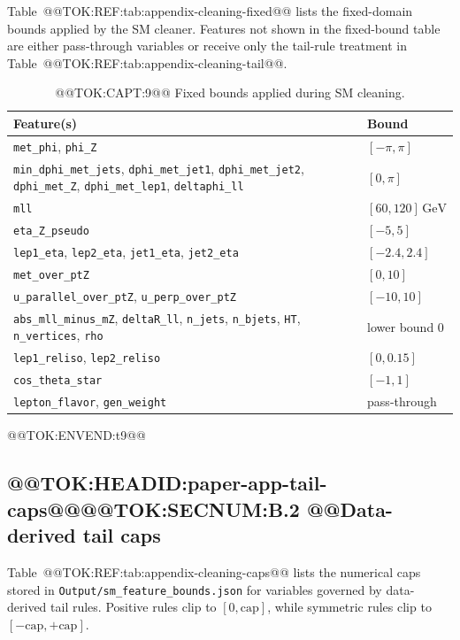\documentclass[11pt]{article}
\newcommand{\GeV}{\text{GeV}}
\begin{document}
Table~@@TOK:REF:tab:appendix-cleaning-fixed@@ lists the fixed-domain bounds applied by the SM
cleaner. Features not shown in the fixed-bound table are either pass-through variables or
receive only the tail-rule treatment in Table~@@TOK:REF:tab:appendix-cleaning-tail@@.

\begin{table}[h]
\centering
\caption{@@TOK:CAPT:9@@ Fixed bounds applied during SM cleaning.}
\label{tab:appendix-cleaning-fixed}
%
\begin{tabular}{ll}
\toprule
Feature(s) & Bound \\
\midrule
\texttt{met\_phi}, \texttt{phi\_Z} & \([-\pi,\pi]\) \\
\texttt{min\_dphi\_met\_jets}, \texttt{dphi\_met\_jet1}, \texttt{dphi\_met\_jet2}, \texttt{dphi\_met\_Z}, \texttt{dphi\_met\_lep1}, \texttt{deltaphi\_ll} & \([0,\pi]\) \\
\texttt{mll} & \([60,120]\,\GeV\) \\
\texttt{eta\_Z\_pseudo} & \([-5,5]\) \\
\texttt{lep1\_eta}, \texttt{lep2\_eta}, \texttt{jet1\_eta}, \texttt{jet2\_eta} & \([-2.4,2.4]\) \\
\texttt{met\_over\_ptZ} & \([0,10]\) \\
\texttt{u\_parallel\_over\_ptZ}, \texttt{u\_perp\_over\_ptZ} & \([-10,10]\) \\
\texttt{abs\_mll\_minus\_mZ}, \texttt{deltaR\_ll}, \texttt{n\_jets}, \texttt{n\_bjets}, \texttt{HT}, \texttt{n\_vertices}, \texttt{rho} & lower bound 0 \\
\texttt{lep1\_reliso}, \texttt{lep2\_reliso} & \([0,0.15]\) \\
\texttt{cos\_theta\_star} & \([-1,1]\) \\
\texttt{lepton\_flavor}, \texttt{gen\_weight} & pass-through \\
\bottomrule
\end{tabular}

@@TOK:ENVEND:t9@@\end{table}

\subsection{@@TOK:HEADID:paper-app-tail-caps@@@@TOK:SECNUM:B.2 @@Data-derived tail caps}

Table~@@TOK:REF:tab:appendix-cleaning-caps@@ lists the numerical caps stored in
\texttt{Output/sm\_feature\_bounds.json} for variables governed by data-derived tail
rules. Positive rules clip to \([0,\mathrm{cap}]\), while symmetric rules clip to
\([-\mathrm{cap},+\mathrm{cap}]\).
\end{document}
